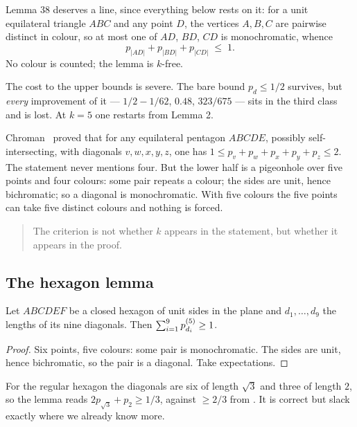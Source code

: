 Lemma 38 deserves a line, since everything below rests on it: for a unit
equilateral triangle $ABC$ and any point $D$, the vertices $A,B,C$ are pairwise
distinct in colour, so at most one of $AD$, $BD$, $CD$ is monochromatic, whence
\[
p_{|AD|}+p_{|BD|}+p_{|CD|}\;\le\;1 .
\]
No colour is counted; the lemma is $k$-free.

The cost to the upper bounds is severe. The bare bound $p_d\le1/2$ survives, but
\emph{every} improvement of it --- $1/2-1/62$, $0.48$, $323/675$ --- sits in the
third class and is lost. At $k=5$ one restarts from Lemma 2.

\begin{remark}
Chroman~\cite{Polymath16} proved that for any equilateral pentagon $ABCDE$, possibly
self-intersecting, with diagonals $v,w,x,y,z$, one has
$1\le p_v+p_w+p_x+p_y+p_z\le2$. The statement never mentions four. But the lower
half is a pigeonhole over five points and four colours: some pair repeats a
colour; the sides are unit, hence bichromatic; so a diagonal is monochromatic.
With five colours the five points can take five distinct colours and nothing is
forced.
\end{remark}

\begin{quote}
The criterion is not whether $k$ appears in the statement, but whether it
appears in the proof.
\end{quote}

\subsection{The hexagon lemma}

\begin{lemma}
\label{lem:hexagon}
Let $ABCDEF$ be a closed hexagon of unit sides in the plane and $d_1,\dots,d_9$
the lengths of its nine diagonals. Then $\sum_{i=1}^{9}p^{(5)}_{d_i}\ge1$.
\end{lemma}

\begin{proof}
Six points, five colours: some pair is monochromatic. The sides are unit, hence
bichromatic, so the pair is a diagonal. Take expectations.
\end{proof}

For the regular hexagon the diagonals are six of length $\sqrt3$ and three of
length $2$, so the lemma reads $2p_{\sqrt3}+p_2\ge1/3$, against $\ge2/3$ from
. It is correct but slack exactly where we already know more.

